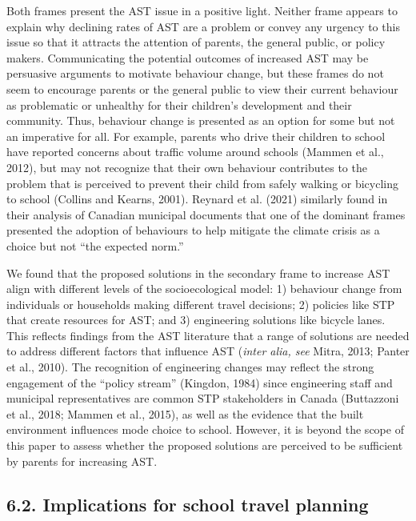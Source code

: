 \documentclass[]{elsarticle} %
\begin{document}
Both frames present the AST issue in a positive light. Neither frame
appears to explain why declining rates of AST are a problem or convey
any urgency to this issue so that it attracts the attention of parents,
the general public, or policy makers. Communicating the potential
outcomes of increased AST may be persuasive arguments to motivate
behaviour change, but these frames do not seem to encourage parents or
the general public to view their current behaviour as problematic or
unhealthy for their children's development and their community. Thus,
behaviour change is presented as an option for some but not an
imperative for all. For example, parents who drive their children to
school have reported concerns about traffic volume around schools
(Mammen et al., 2012), but may not recognize that their own behaviour
contributes to the problem that is perceived to prevent their child from
safely walking or bicycling to school (Collins and Kearns, 2001).
Reynard et al. (2021) similarly found in their analysis of Canadian
municipal documents that one of the dominant frames presented the
adoption of behaviours to help mitigate the climate crisis as a choice
but not ``the expected norm.''

We found that the proposed solutions in the secondary frame to increase
AST align with different levels of the socioecological model: 1)
behaviour change from individuals or households making different travel
decisions; 2) policies like STP that create resources for AST; and 3)
engineering solutions like bicycle lanes. This reflects findings from
the AST literature that a range of solutions are needed to address
different factors that influence AST (\emph{inter alia, see} Mitra,
2013; Panter et al., 2010). The recognition of engineering changes may
reflect the strong engagement of the ``policy stream'' (Kingdon, 1984)
since engineering staff and municipal representatives are common STP
stakeholders in Canada (Buttazzoni et al., 2018; Mammen et al., 2015),
as well as the evidence that the built environment influences mode
choice to school. However, it is beyond the scope of this paper to
assess whether the proposed solutions are perceived to be sufficient by
parents for increasing AST.

\hypertarget{implications-for-school-travel-planning}{%
\subsection{6.2. Implications for school travel
planning}\label{implications-for-school-travel-planning}}
\end{document}
